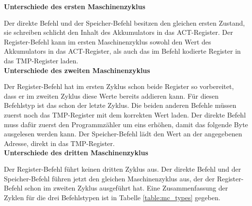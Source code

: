 \documentclass[12pt]{article}
\begin{document}
\noindent
\textbf{Unterschiede des ersten Maschinenzyklus}

\noindent
Der direkte Befehl und der Speicher-Befehl besitzen den gleichen ersten Zustand, sie schreiben schlicht den Inhalt des Akkumulators in das ACT-Register.
Der Register-Befehl kann im ersten Maschinenzyklus sowohl den Wert des Akkumulators in das ACT-Register, als auch das im Befehl kodierte Register in das TMP-Register laden.
\\

\noindent
\textbf{Unterschiede des zweiten Maschinenzyklus}

\noindent
Der Register-Befehl hat im ersten Zyklus schon beide Register so vorbereitet, dass er im zweiten Zyklus diese Werte bereits addieren kann. Für diesen Befehlstyp ist das schon der letzte Zyklus.
Die beiden anderen Befehle müssen zuerst noch das TMP-Register mit dem korrekten Wert laden. Der direkte Befehl muss dafür zuerst den Programmzähler um eins erhöhen, damit das folgende Byte ausgelesen werden kann. Der Speicher-Befehl lädt den Wert an der angegebenen Adresse, direkt in das TMP-Register.
\\

\noindent
\textbf{Unterschiede des dritten Maschinenzyklus}

\noindent
Der Register-Befehl führt keinen dritten Zyklus aus.
Der direkte Befehl und der Speicher-Befehl führen jetzt den gleichen Maschinenzyklus aus, der der Register-Befehl schon im zweiten Zyklus ausgeführt hat. Eine Zusammenfassung der Zyklen für die drei Befehlstypen ist in Tabelle \ref{table:mc_types} gegeben.
\end{document}
